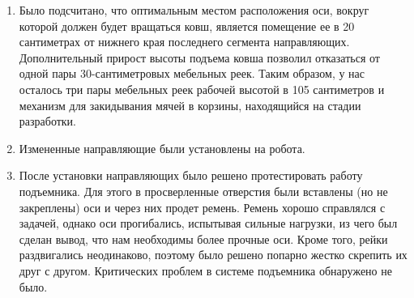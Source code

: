 \begin{enumerate}
\begin{enumerate}
      \item  Было подсчитано, что оптимальным местом расположения оси, вокруг которой должен будет вращаться ковш, является помещение ее в 20 сантиметрах от нижнего края последнего сегмента направляющих. Дополнительный прирост высоты подъема ковша позволил отказаться от одной пары 30-сантиметровых мебельных реек. Таким образом, у нас осталось три пары мебельных реек рабочей высотой в 105 сантиметров и механизм для закидывания мячей в корзины, находящийся на стадии разработки.
      
      \item  Измененные направляющие были установлены на робота.
      
      \item  После установки направляющих было решено протестировать работу подъемника. Для этого в просверленные отверстия были вставлены (но не закреплены) оси и через них продет ремень. Ремень хорошо справлялся с задачей, однако оси прогибались, испытывая сильные нагрузки, из чего был сделан вывод, что нам необходимы более прочные оси. Кроме того, рейки раздвигались неодинаково, поэтому было решено попарно жестко скрепить  их друг с другом. Критических проблем в системе подъемника обнаружено не было.
      

\end{enumerate}
\end{enumerate}
